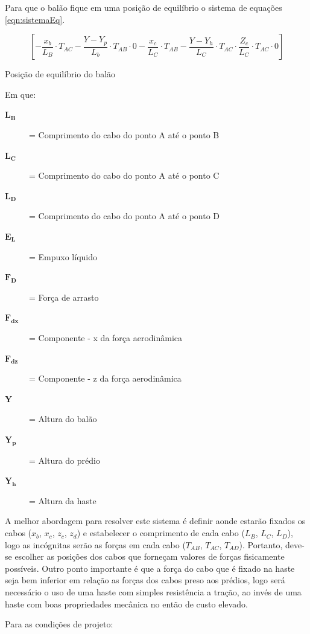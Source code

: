 	Para que o balão fique em uma posição de equilíbrio o sistema de equações \eqref{eqn:sistemaEq}.

	\begin{equacao}
		\begin{equation}
			\left [ - \frac{x_{b}}{L_{B}} \cdot T_{AC} - \frac{Y-Y_{p}}{L_{b}} \cdot T_{AB} \cdot 0 - \frac{x_{c}}{L_{C}} \cdot T_{AB} - \frac{Y-Y_{h}}{L_{C}} \cdot T_{AC} \cdot \frac{Z_{c}}{L_{C}} \cdot T_{AC} \cdot 0 \right ]
		\end{equation}
		\caption{Posição de equilíbrio do balão}
		\label{eqn:sistemaEq}
	\end{equacao}

	Em que:
	\begin{description}
		\item[$\boldsymbol{L_{B}}$] = Comprimento do cabo do ponto A até o ponto B
		\item[$\boldsymbol{L_{C}}$] = Comprimento do cabo do ponto A até o ponto C
		\item[$\boldsymbol{L_{D}}$] = Comprimento do cabo do ponto A até o ponto D
		\item[$\boldsymbol{E_{L}}$] = Empuxo líquido
		\item[$\boldsymbol{F_{D}}$] = Força de arrasto
		\item[$\boldsymbol{F_{dx}}$] = Componente - x da força aerodinâmica
		\item[$\boldsymbol{F_{dz}}$] = Componente - z da força aerodinâmica
		\item[$\boldsymbol{Y}$] = Altura do balão
		\item[$\boldsymbol{Y_{p}}$] = Altura do prédio
		\item[$\boldsymbol{Y_{h}}$] = Altura da haste
	\end{description}

A melhor abordagem para resolver este sistema é definir aonde estarão fixados os cabos ($x_{b}$, $x_{c}$, $z_{c}$, $z_{d}$) e estabelecer o comprimento de cada cabo ($L_{B}$, $L_{C}$, $L_{D}$), logo as incógnitas serão as forças em cada cabo ($T_{AB}$, $T_{AC}$, $T_{AD}$). Portanto, deve-se escolher as posições dos cabos que forneçam valores de forças fisicamente possíveis. Outro ponto importante é que a força do cabo que é fixado na haste seja bem inferior em relação as forças dos cabos preso aos prédios, logo será necessário o uso de uma haste com simples resistência a tração, ao invés de uma haste com boas propriedades mecânica no então de custo elevado.

	Para as condições de projeto:


